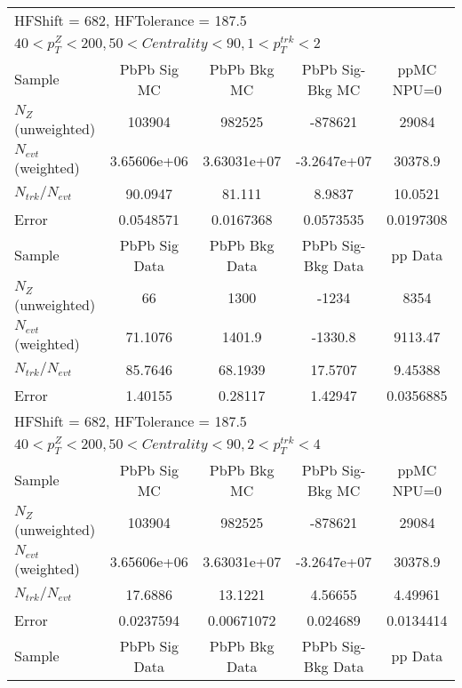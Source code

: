 \clearpage
\begin{table}[h!]
\centering
\begin{tabular}{|l|c|c|c|c|}
\multicolumn{5}{l}{ HFShift = 682, HFTolerance = 187.5}\\
\multicolumn{5}{l}{ $40 < p_{T}^{Z} < 200, 50 < Centrality < 90, 1 < p_{T}^{trk} < 2$}\\
\hline\hline
Sample         & PbPb Sig MC    & PbPb Bkg MC    & PbPb Sig-Bkg MC& ppMC NPU=0     \\
$N_Z$ (unweighted)& 103904         & 982525         & -878621        & 29084          \\
$N_{evt}$ (weighted)& 3.65606e+06    & 3.63031e+07    & -3.2647e+07    & 30378.9        \\
$N_{trk}/N_{evt}$& 90.0947        & 81.111         & 8.9837         & 10.0521        \\
Error          & 0.0548571      & 0.0167368      & 0.0573535      & 0.0197308      \\
\hline
Sample         & PbPb Sig Data  & PbPb Bkg Data  & PbPb Sig-Bkg Data& pp Data  \\
$N_Z$ (unweighted)& 66             & 1300           & -1234          & 8354           \\
$N_{evt}$ (weighted)& 71.1076        & 1401.9         & -1330.8        & 9113.47        \\
$N_{trk}/N_{evt}$& 85.7646        & 68.1939        & 17.5707        & 9.45388        \\
Error          & 1.40155        & 0.28117        & 1.42947        & 0.0356885      \\
\hline\hline
\multicolumn{5}{l}{ HFShift = 682, HFTolerance = 187.5}\\
\multicolumn{5}{l}{ $40 < p_{T}^{Z} < 200, 50 < Centrality < 90, 2 < p_{T}^{trk} < 4$}\\
\hline\hline
Sample         & PbPb Sig MC    & PbPb Bkg MC    & PbPb Sig-Bkg MC& ppMC NPU=0     \\
$N_Z$ (unweighted)& 103904         & 982525         & -878621        & 29084          \\
$N_{evt}$ (weighted)& 3.65606e+06    & 3.63031e+07    & -3.2647e+07    & 30378.9        \\
$N_{trk}/N_{evt}$& 17.6886        & 13.1221        & 4.56655        & 4.49961        \\
Error          & 0.0237594      & 0.00671072     & 0.024689       & 0.0134414      \\
\hline
Sample         & PbPb Sig Data  & PbPb Bkg Data  & PbPb Sig-Bkg Data& pp Data  \\

\end{tabular}
\end{table}
